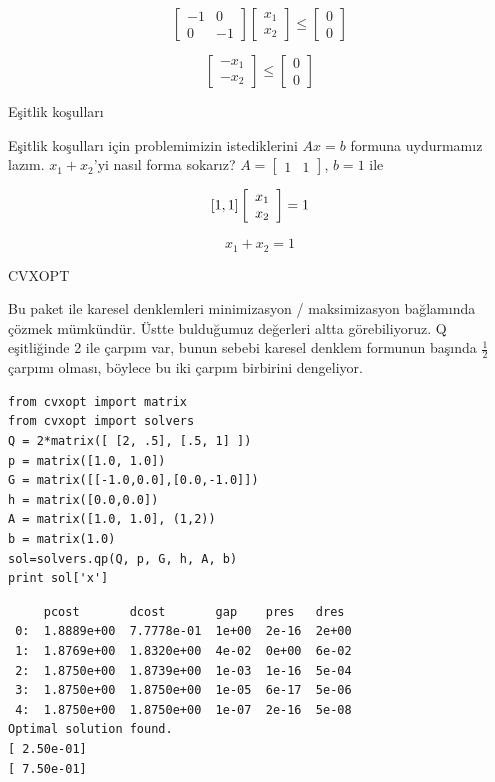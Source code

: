 \documentclass[12pt,fleqn]{article}\usepackage{../../common}
\begin{document}
$$ 
\left[ \begin{array}{cc}
-1 & 0 \\  0 & -1
\end{array} \right]
\left[ \begin{array}{c}
 x_1 \\ x_2
\end{array} \right]
\leq
\left[ \begin{array}{c}
0 \\  0
\end{array} \right]
$$

$$ 
\left[ \begin{array}{c}
-x_1 \\  -x_2
\end{array} \right]
\leq
\left[ \begin{array}{c}
 0 \\  0
\end{array} \right]
$$

Eşitlik koşulları

Eşitlik koşulları için problemimizin istediklerini $Ax = b$ formuna uydurmamız
lazım. $x_1 + x_2$'yi nasıl forma sokarız? $A = \left[\begin{array}{cc} 1 & 1 \end{array}\right]$, $b = 1$
ile

$$ 
[1, 1] \left[ \begin{array}{c}
x_1 \\  x_2
\end{array} \right] 
= 1 \\
$$

$$ x_1 + x_2 = 1 $$

CVXOPT

Bu paket ile karesel denklemleri minimizasyon / maksimizasyon bağlamında çözmek
mümkündür. Üstte bulduğumuz değerleri altta görebiliyoruz. Q eşitliğinde 2 ile
çarpım var, bunun sebebi karesel denklem formunun başında $\frac{1}{2}$ çarpımı
olması, böylece bu iki çarpım birbirini dengeliyor.

\begin{verbatim}
from cvxopt import matrix
from cvxopt import solvers
Q = 2*matrix([ [2, .5], [.5, 1] ])
p = matrix([1.0, 1.0])
G = matrix([[-1.0,0.0],[0.0,-1.0]])
h = matrix([0.0,0.0])
A = matrix([1.0, 1.0], (1,2))
b = matrix(1.0)
sol=solvers.qp(Q, p, G, h, A, b)
print sol['x']
\end{verbatim}

\begin{verbatim}
     pcost       dcost       gap    pres   dres
 0:  1.8889e+00  7.7778e-01  1e+00  2e-16  2e+00
 1:  1.8769e+00  1.8320e+00  4e-02  0e+00  6e-02
 2:  1.8750e+00  1.8739e+00  1e-03  1e-16  5e-04
 3:  1.8750e+00  1.8750e+00  1e-05  6e-17  5e-06
 4:  1.8750e+00  1.8750e+00  1e-07  2e-16  5e-08
Optimal solution found.
[ 2.50e-01]
[ 7.50e-01]

\end{verbatim}
\end{document}
